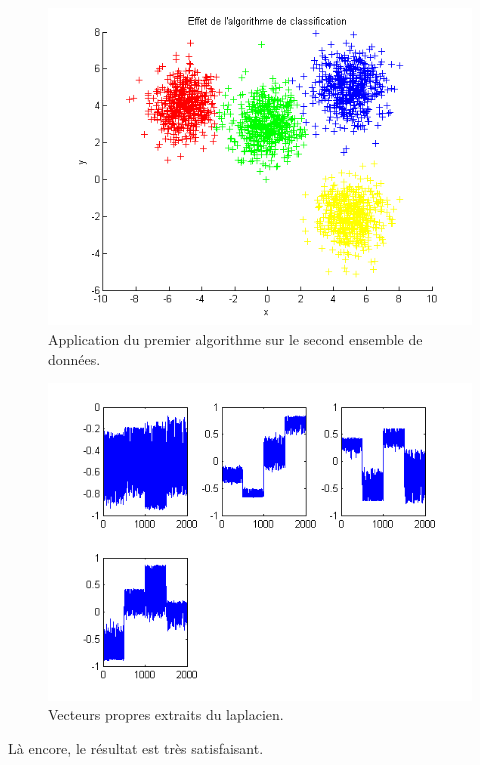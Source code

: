 \begin{figure}[H]
\centering
    \includegraphics[scale=0.6,angle=0]{Images/AlgoClssification2.png}
    \caption{Application du premier algorithme sur le second ensemble de données.}
    \label{fig:AlgoClssification2}
\end{figure}

\begin{figure}[H]
\centering
    \includegraphics[scale=0.4,angle=0]{Images/VecteursPropres2.png}
    \caption{Vecteurs propres extraits du laplacien.}
    \label{fig:VecteursPropres2}
\end{figure}

Là encore, le résultat est très satisfaisant.


